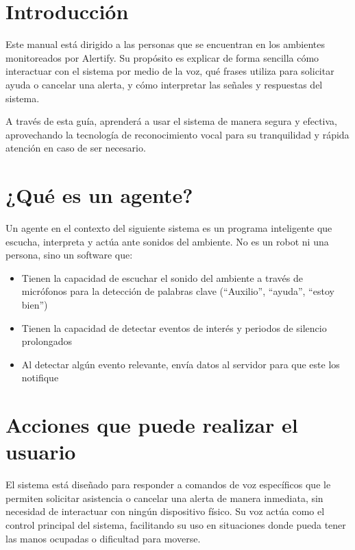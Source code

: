 
\section*{Introducción}

Este manual está dirigido a las personas que se encuentran en los ambientes monitoreados por Alertify. Su propósito es explicar de forma sencilla cómo interactuar con el sistema por medio de la voz, qué frases utiliza para solicitar ayuda o cancelar una alerta, y cómo interpretar las señales y respuestas del sistema.

A través de esta guía, aprenderá a usar el sistema de manera segura y efectiva, aprovechando la tecnología de reconocimiento vocal para su tranquilidad y rápida atención en caso de ser necesario.

\section*{¿Qué es un agente?}

Un agente en el contexto del siguiente sistema es un programa inteligente que escucha, interpreta y actúa ante sonidos del ambiente. No es un robot ni una persona, sino un software que:

\begin{itemize}
  \item Tienen la capacidad de escuchar el sonido del ambiente a través de micrófonos para la detección de palabras clave (“Auxilio”, “ayuda”, “estoy bien”)
  \item Tienen la capacidad de detectar eventos de interés y periodos de silencio prolongados
  \item Al detectar algún evento relevante, envía datos al servidor para que este los notifique
\end{itemize}

\section*{Acciones que puede realizar el usuario}

El sistema está diseñado para responder a comandos de voz específicos que le permiten solicitar asistencia o cancelar una alerta de manera inmediata, sin necesidad de interactuar con ningún dispositivo físico. Su voz actúa como el control principal del sistema, facilitando su uso en situaciones donde pueda tener las manos ocupadas o dificultad para moverse.

